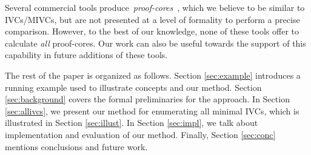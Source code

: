 Several commercial tools produce~\emph{proof-cores}~\cite{hanna2015formal, jasper_gold}, which we believe to be similar to IVCs/MIVCs, but are not presented at a level of formality to perform a precise comparison.  However, to the best of our knowledge, none of these tools offer to calculate \emph{all} proof-cores.  Our work can also be useful towards the support of this capability in future additions of these tools.



The rest of the paper is organized as follows.
Section \ref{sec:example} introduces a running example used to illustrate concepts and our method.
Section \ref{sec:background} covers the formal preliminaries for the approach.
In Section \ref{sec:allivcs}, we present our method for enumerating all minimal IVCs,
which is illustrated in Section \ref{sec:illust}. In Section \ref{sec:impl}, we talk about implementation and evaluation of our method. 
Finally, Section \ref{sec:conc} mentions conclusions and future work. 